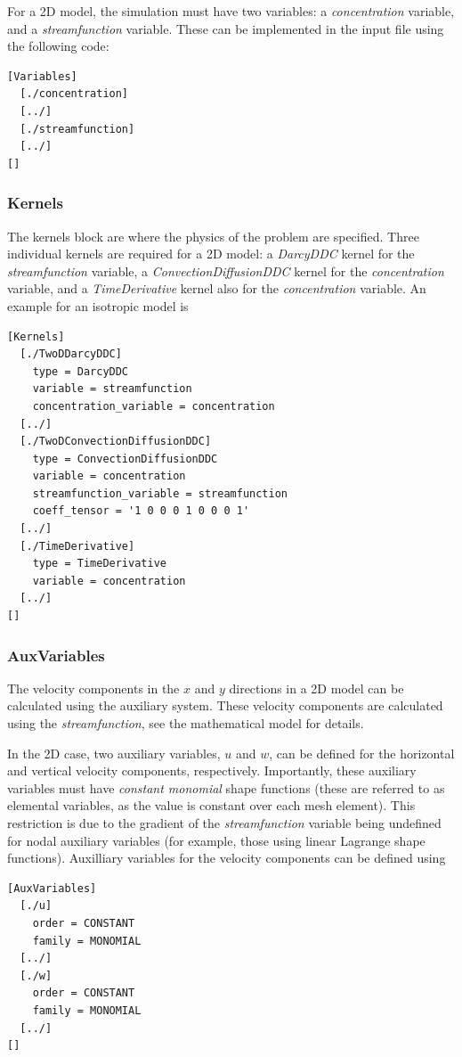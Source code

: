 \documentclass[11pt, a4paper]{csiroreport2012}
\begin{document}
For a 2D model, the simulation must have two variables: a \emph{concentration} variable, and a \emph{streamfunction} variable. These can be implemented in the input file using the following code:

\begin{shaded}
\begin{verbatim}
[Variables]  
  [./concentration]  
  [../]  
  [./streamfunction]  
  [../]  
[]
\end{verbatim}
\end{shaded}

\subsubsection*{Kernels}

The kernels block are where the physics of the problem are specified. Three individual kernels are required for a 2D model: a \emph{DarcyDDC} kernel for the \emph{streamfunction} variable, a \emph{ConvectionDiffusionDDC} kernel for the \emph{concentration} variable, and a \emph{TimeDerivative} kernel also for the \emph{concentration} variable. An example for an isotropic model is

\begin{shaded}
\begin{verbatim}
[Kernels]
  [./TwoDDarcyDDC]
    type = DarcyDDC
    variable = streamfunction
    concentration_variable = concentration
  [../]
  [./TwoDConvectionDiffusionDDC]
    type = ConvectionDiffusionDDC
    variable = concentration
    streamfunction_variable = streamfunction
    coeff_tensor = '1 0 0 0 1 0 0 0 1'
  [../]
  [./TimeDerivative]
    type = TimeDerivative
    variable = concentration
  [../]
[]
\end{verbatim}
\end{shaded}

\subsubsection*{AuxVariables}

The velocity components in the $x$ and $y$ directions in a 2D model can be calculated using the auxiliary system. These velocity components are calculated using the \emph{streamfunction}, see the mathematical model for details.

In the 2D case, two auxiliary variables, $u$ and $w$, can be defined for the horizontal and vertical velocity components, respectively. Importantly, these auxiliary variables must have \emph{constant monomial} shape functions (these are referred to as elemental variables, as the value is constant over each mesh element). This restriction is due to the gradient of the \emph{streamfunction} variable being undefined for nodal auxiliary variables (for example, those using linear Lagrange shape functions). Auxilliary variables for the velocity components can be defined using
\begin{shaded}
\begin{verbatim}
[AuxVariables]
  [./u]
    order = CONSTANT
    family = MONOMIAL
  [../]
  [./w]
    order = CONSTANT
    family = MONOMIAL
  [../]
[]
\end{verbatim}
\end{shaded}
\end{document}

